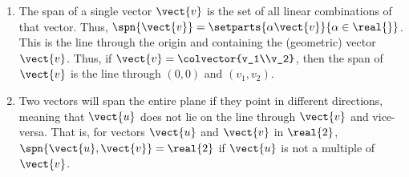 \begin{enumerate}
\item
The span of a single vector $\vect{v}$ is the set of all linear combinations of that vector.  Thus, 
$\spn{\vect{v}} = \setparts{\alpha\vect{v}}{\alpha\in\real{\relax}}$.  
This is the line through the origin and containing the (geometric) vector $\vect{v}$.  Thus, if 
$\vect{v}=\colvector{v_1\\v_2}$, 
then the span of $\vect{v}$ is the line through $(0,0)$ and $(v_1,v_2)$.
%
\item 
Two vectors will span the entire plane if they point in different directions, meaning that $\vect{u}$ does not lie on the line through $\vect{v}$ and vice-versa.  That is, for vectors $\vect{u}$ and $\vect{v}$ in $\real{2}$, $\spn{\vect{u}, \vect{v}} = \real{2}$ if $\vect{u}$ is not a multiple of $\vect{v}$.
\end{enumerate}